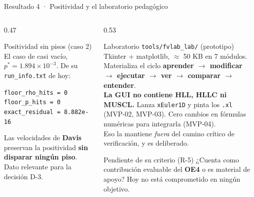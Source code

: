 \documentclass[aspectratio=169,10pt]{beamer}
\newcommand{\cod}[1]{\texttt{\small #1}}
\begin{document}
\begin{frame}[shrink]{Resultado 4 · Positividad y el laboratorio pedagógico}

  \begin{columns}[t]
    \begin{column}{0.47\textwidth}
      \begin{exampleblock}{Positividad sin pisos (caso 2)}
        \scriptsize
        El caso de casi vacío, $p^* = 1.894\times10^{-3}$. De su
        \cod{run\_info.txt} de hoy:
        \begin{center}
          \cod{floor\_rho\_hits = 0}\\
          \cod{floor\_p\_hits = 0}\\
          \cod{exact\_residual = 8.882e-16}
        \end{center}
        Las velocidades de \textbf{Davis} preservan la positividad
        \textbf{sin disparar ningún piso}. Dato relevante para la decisión D-3.
      \end{exampleblock}
    \end{column}
    \begin{column}{0.53\textwidth}
      \begin{block}{Laboratorio \cod{tools/fvlab\_lab/} (prototipo)}
        \scriptsize
        Tkinter + matplotlib, $\approx$ 50 KB en 7 módulos. Materializa el ciclo
        \textbf{aprender $\to$ modificar $\to$ ejecutar $\to$ ver $\to$ comparar
        $\to$ entender}.
        \\[3pt]
        \textbf{La GUI no contiene HLL, HLLC ni MUSCL.} Lanza \cod{xEuler1D} y
        pinta los \cod{.xl} (MVP-02, MVP-03). Cero cambios en fórmulas numéricas
        para integrarla (MVP-04).
        \\[3pt]
        Eso la mantiene \emph{fuera} del camino crítico de verificación, y es
        deliberado.
      \end{block}
      \begin{alertblock}{Pendiente de su criterio (R-5)}
        \scriptsize
        ¿Cuenta como contribución evaluable del \textbf{OE4} o es material de
        apoyo? Hoy no está comprometido en ningún objetivo.
      \end{alertblock}
    \end{column}
  \end{columns}
\end{frame}
\end{document}

